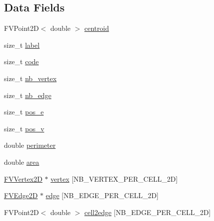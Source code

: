 \subsection*{Data Fields}
\begin{DoxyCompactItemize}
\item 
FVPoint2D$<$ double $>$ \hyperlink{classFVCell2D_ab3ed78ad91cf05def39147f46817c454}{centroid}
\item 
size\_\-t \hyperlink{classFVCell2D_a1ec973463c76e6d9e91160720959ad68}{label}
\item 
size\_\-t \hyperlink{classFVCell2D_acf258c3b3328a96e3ee1e3b875b7874f}{code}
\item 
size\_\-t \hyperlink{classFVCell2D_a0a063e99fbc85e837d93dfbcda6f5252}{nb\_\-vertex}
\item 
size\_\-t \hyperlink{classFVCell2D_a71d1c26cc375a03060b9eb8453a3680a}{nb\_\-edge}
\item 
size\_\-t \hyperlink{classFVCell2D_a6320f7771a5dd32537e636a23fbf7e7c}{pos\_\-e}
\item 
size\_\-t \hyperlink{classFVCell2D_a9edf0688f0159bed5d3a6828f63146fd}{pos\_\-v}
\item 
double \hyperlink{classFVCell2D_a079d8fd569c3406fb63e0511eb0338c0}{perimeter}
\item 
double \hyperlink{classFVCell2D_ae517bffd82b9428b4f1d9500ea01c04f}{area}
\item 
\hyperlink{classFVVertex2D}{FVVertex2D} $\ast$ \hyperlink{classFVCell2D_a43af246790b321630c5b93c98d944c4e}{vertex} \mbox{[}NB\_\-VERTEX\_\-PER\_\-CELL\_\-2D\mbox{]}
\item 
\hyperlink{classFVEdge2D}{FVEdge2D} $\ast$ \hyperlink{classFVCell2D_aaef61084c7d087b06124b4e122b26eba}{edge} \mbox{[}NB\_\-EDGE\_\-PER\_\-CELL\_\-2D\mbox{]}
\item 
FVPoint2D$<$ double $>$ \hyperlink{classFVCell2D_a99bffb94997ba2dc39e4184c17166cce}{cell2edge} \mbox{[}NB\_\-EDGE\_\-PER\_\-CELL\_\-2D\mbox{]}
\end{DoxyCompactItemize}


